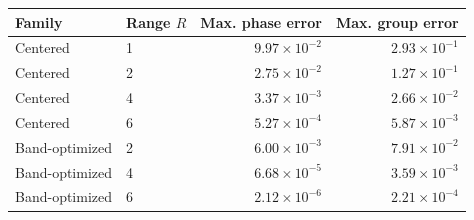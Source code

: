 \begin{tabular}{llrr}
\hline
Family & Range $R$ & Max. phase error & Max. group error \\ \hline
Centered & 1 & $9.97\times10^{-2}$ & $2.93\times10^{-1}$ \\
Centered & 2 & $2.75\times10^{-2}$ & $1.27\times10^{-1}$ \\
Centered & 4 & $3.37\times10^{-3}$ & $2.66\times10^{-2}$ \\
Centered & 6 & $5.27\times10^{-4}$ & $5.87\times10^{-3}$ \\
Band-optimized & 2 & $6.00\times10^{-3}$ & $7.91\times10^{-2}$ \\
Band-optimized & 4 & $6.68\times10^{-5}$ & $3.59\times10^{-3}$ \\
Band-optimized & 6 & $2.12\times10^{-6}$ & $2.21\times10^{-4}$ \\
\hline
\end{tabular}
